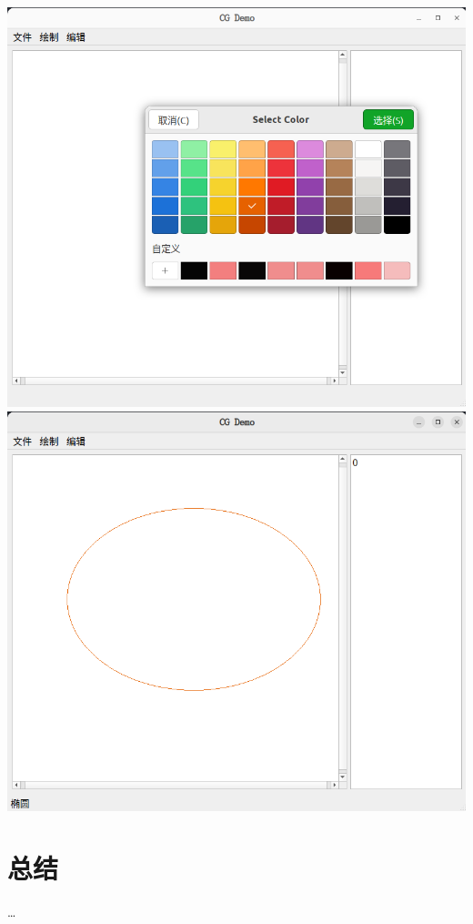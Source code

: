 \documentclass[a4paper,UTF8]{article}
\theoremstyle{definition}
\begin{document}
\begin{center}
	\includegraphics[width=6in]{figs/color1.png}
	\includegraphics[width=6in]{figs/color2.png}
\end{center}

\section{总结}
\dots

%

\end{document}
